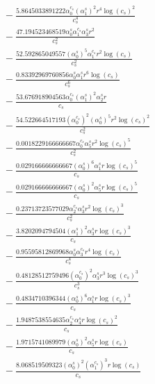 \documentclass[10pt]{article}
\begin{document}
\begin{align*}
&{}  - \frac{5.8645033891222 \alpha_{0}^{c_s} \left(\alpha_{1}^s\right)^{2} r^{4} \log{\left(c_{s} \right)}^{2}}{c_{s}^{4}} \\
&{}  - \frac{47.194523468519 \alpha_{0}^s \alpha_{1}^{c_s} \alpha_{3}^s r^{2}}{c_{s}^{2}} \\
&{}  - \frac{52.592865049557 \left(\alpha_{0}^s\right)^{5} \alpha_{1}^{c_s} r^{2} \log{\left(c_{s} \right)}}{c_{s}^{2}} \\
&{}  - \frac{0.83392969760856 \alpha_{0}^s \alpha_{1}^s r^{6} \log{\left(c_{s} \right)}}{c_{s}^{6}} \\
&{}  - \frac{53.676918904563 \alpha_{0}^{c_s} \left(\alpha_{1}^s\right)^{2} \alpha_{2}^s r}{c_{s}} \\
&{}  - \frac{54.522664517193 \left(\alpha_{0}^{c_s}\right)^{2} \left(\alpha_{0}^s\right)^{5} r^{2} \log{\left(c_{s} \right)}^{2}}{c_{s}^{2}} \\
&{}  - \frac{0.0018229166666667 \alpha_{0}^{c_s} \alpha_{5}^s r^{2} \log{\left(c_{s} \right)}^{5}}{c_{s}^{2}} \\
&{}  - \frac{0.029166666666667 \left(\alpha_{0}^s\right)^{6} \alpha_{1}^s r \log{\left(c_{s} \right)}^{5}}{c_{s}} \\
&{}  - \frac{0.029166666666667 \left(\alpha_{0}^s\right)^{2} \alpha_{5}^s r \log{\left(c_{s} \right)}^{5}}{c_{s}} \\
&{}  - \frac{0.23713723577029 \alpha_{2}^{c_s} \alpha_{3}^s r^{2} \log{\left(c_{s} \right)}^{3}}{c_{s}^{2}} \\
&{}  - \frac{3.8202094794504 \left(\alpha_{1}^s\right)^{2} \alpha_{3}^s r \log{\left(c_{s} \right)}^{3}}{c_{s}} \\
&{}  - \frac{0.95595812869968 \alpha_{0}^s \alpha_{3}^{c_s} r^{4} \log{\left(c_{s} \right)}}{c_{s}^{4}} \\
&{}  - \frac{0.48128512759496 \left(\alpha_{0}^{c_s}\right)^{2} \alpha_{3}^s r^{3} \log{\left(c_{s} \right)}^{3}}{c_{s}^{3}} \\
&{}  - \frac{0.4834710396344 \left(\alpha_{0}^s\right)^{6} \alpha_{1}^s r \log{\left(c_{s} \right)}^{3}}{c_{s}} \\
&{}  - \frac{1.9487538554635 \alpha_{2}^{c_s} \alpha_{4}^s r \log{\left(c_{s} \right)}^{2}}{c_{s}} \\
&{}  - \frac{1.9715741089979 \left(\alpha_{0}^s\right)^{2} \alpha_{5}^s r \log{\left(c_{s} \right)}}{c_{s}} \\
&{}  - \frac{8.068519509323 \left(\alpha_{0}^s\right)^{2} \left(\alpha_{1}^{c_s}\right)^{3} r \log{\left(c_{s} \right)}}{c_{s}} \\

\end{align*}
\end{document}
